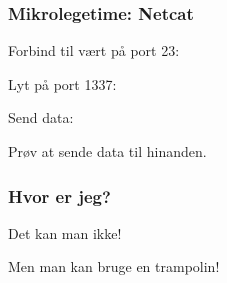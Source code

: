 \documentclass[slidestop,compress,mathserif, xcolor=table]{beamer}
\begin{document}
\begin{frame}[c]
    \frametitle{Mikrolegetime: Netcat}

    \lstset{language=bash, numbers=none}
    \pause
    Forbind til vært på port 23:
    
    \pause
    Lyt på port 1337:
    
    \pause
    Send data:
    

    Prøv at sende data til hinanden.
\end{frame}

\begin{frame}[c]
    \frametitle{Hvor er jeg?}

    \pause

    \pause Det kan man ikke! \vskip8pt

    \pause Men man kan bruge en trampolin!

    \pause

\end{frame}
\end{document}
